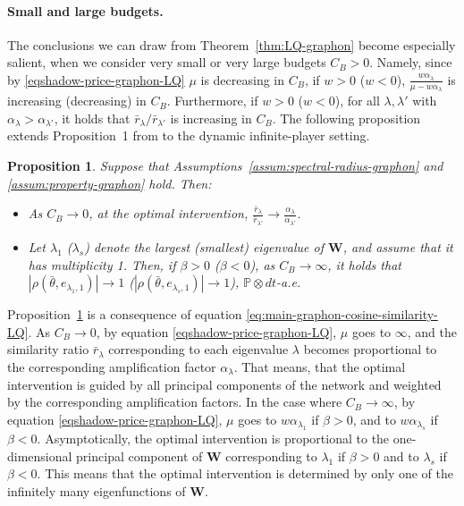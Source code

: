 \documentclass[11pt]{article}
\def\al{\alpha}
\def\P{\mathbb{P}}
\newtheorem{proposition}[theorem]{Proposition}
\numberwithin{equation}{section}
\begin{document}
\paragraph{Small and large budgets.}
The conclusions we can draw from Theorem~\ref{thm:LQ-graphon} become especially salient, when we consider very small or very large budgets $C_B>0$. Namely, since by \eqref{eqshadow-price-graphon-LQ} $\mu$ is decreasing in $C_B$, if $w>0$ ($w<0$), $\frac{w\al_\lambda}{\mu-w\al_\lambda}$ is increasing (decreasing) in $C_B$. Furthermore, if $w>0$ ($w<0$), for all $\lambda,\lambda'$ with $\al_\lambda>\al_{\lambda'}$, it holds that $\bar{r}_\lambda/\bar{r}_{\lambda'}$ is increasing in $C_B$. The following proposition extends Proposition~1 from \cite{galeotti2020targeting} to the dynamic infinite-player setting.
\begin{proposition}\label{prop:convergence-graphon}
    Suppose that Assumptions~\ref{assum:spectral-radius-graphon} and \ref{assum:property-graphon} hold. Then:
    \begin{itemize}
        \item[(i)] As $C_B\to 0$, at the optimal intervention, $\frac{\bar{r}_\lambda}{\bar{r}_{\lambda'}}\to\frac{\al_\lambda}{\al_{\lambda'}}$.
        \item[(ii)] Let $\lambda_1$ ($\lambda_{s}$) denote the largest (smallest) eigenvalue of $\boldsymbol{W}$, and assume that it has multiplicity 1.  Then, if $\beta>0$ ($\beta<0$), as $C_B\to\infty$, it holds that $|\rho(\bar\theta,e_{\lambda_1,1})|\to 1$ ($|\rho(\bar\theta,e_{\lambda_{s},1})|\to 1$), $\P \otimes dt$-a.e.
    \end{itemize}
\end{proposition}
Proposition~\ref{prop:convergence-graphon} is a consequence of equation \eqref{eq:main-graphon-cosine-similarity-LQ}. As $C_B\to 0$, by equation \eqref{eqshadow-price-graphon-LQ}, $\mu$ goes to $\infty$, and the similarity ratio $\bar{r}_\lambda$ corresponding to each eigenvalue $\lambda$ becomes proportional to the corresponding amplification factor $\al_\lambda$. That means, that the optimal intervention is guided by all principal components of the network and weighted by the corresponding amplification factors. In the case where $C_B\to \infty$, by equation \eqref{eqshadow-price-graphon-LQ}, $\mu$ goes to $w\al_{\lambda_1}$ if $\beta>0$, and to $w\al_{\lambda_{s}}$ if $\beta<0$. Asymptotically, the optimal intervention is proportional to the one-dimensional principal component of $\boldsymbol{W}$ corresponding to $\lambda_1$ if $\beta>0$ and to $\lambda_{s}$ if $\beta<0$. This means that the optimal intervention is determined by only one of the infinitely many eigenfunctions of $\boldsymbol{W}$.
\end{document}
